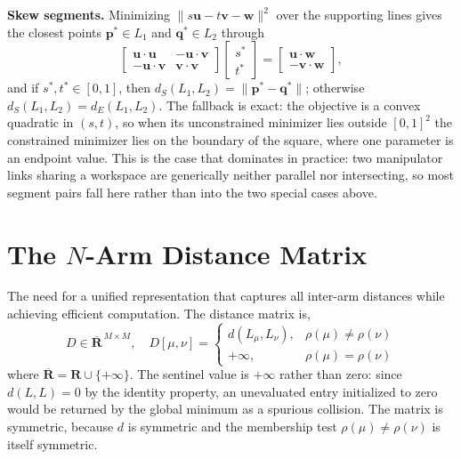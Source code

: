 \textbf{Skew segments.} Minimizing $\lVert s\mathbf{u} - t\mathbf{v} - \mathbf{w} \rVert^2$ over the
supporting lines gives the closest points $\mathbf{p}^* \in L_1$ and $\mathbf{q}^* \in L_2$ through
\begin{equation}
\begin{bmatrix} \mathbf{u}\cdot\mathbf{u} & -\mathbf{u}\cdot\mathbf{v} \\
-\mathbf{u}\cdot\mathbf{v} & \mathbf{v}\cdot\mathbf{v} \end{bmatrix}
\begin{bmatrix} s^* \\ t^* \end{bmatrix} =
\begin{bmatrix} \mathbf{u}\cdot\mathbf{w} \\ -\mathbf{v}\cdot\mathbf{w} \end{bmatrix},
\label{eq:dm_skew}
\end{equation}
and if $s^*, t^* \in [0,1]$, then $d_S(L_1, L_2) = \lVert \mathbf{p}^* - \mathbf{q}^* \rVert$;
otherwise $d_S(L_1, L_2) = d_E(L_1, L_2)$. The fallback is exact: the objective is a convex quadratic
in $(s,t)$, so when its unconstrained minimizer lies outside $[0,1]^2$ the constrained minimizer lies
on the boundary of the square, where one parameter is an endpoint value. This is the case that
dominates in practice: two manipulator links sharing a workspace are generically neither parallel nor
intersecting, so most segment pairs fall here rather than into the two special cases above.

\section{The \texorpdfstring{$N$}{N}-Arm Distance Matrix}\label{sec:dm_matrix}

The need for a unified representation that captures all inter-arm distances while achieving efficient computation. The distance matrix is,
\begin{equation}
{D} \in \overline{\mathbf{R}}^{\,M \times M}, \quad
D[\mu,\nu] =
\begin{cases}
d(L_{\mu}, L_{\nu}), & \rho(\mu) \neq \rho(\nu)\\
+\infty, & \rho(\mu) = \rho(\nu)
\end{cases}
\label{dist_matrix}
\end{equation}
where $\overline{\mathbf{R}} = \mathbf{R} \cup \{+\infty\}$. The sentinel value is $+\infty$ rather than zero: since $d(L,L) = 0$ by the identity property, an unevaluated entry initialized to zero would be returned by the global minimum as a spurious collision. The matrix is symmetric, because $d$ is symmetric and the membership test $\rho(\mu) \neq \rho(\nu)$ is itself symmetric.

